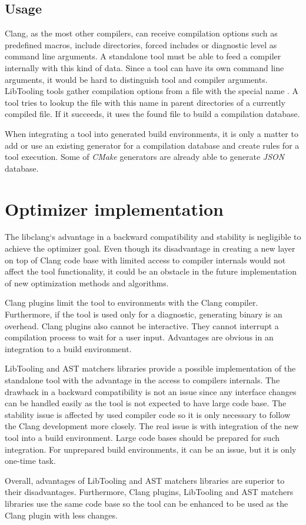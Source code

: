 \subsection{Usage}
Clang, as the most other compilers, can receive compilation options such as predefined macros, include directories, forced includes or diagnostic level as command line arguments. A standalone tool must be able to feed a compiler internally with this kind of data. Since a tool can have its own command line arguments, it would be hard to distinguish tool and compiler arguments. LibTooling tools gather compilation options from a file with the special name . A tool tries to lookup the file with this name in parent directories of a currently compiled file. If it succeeds, it uses the found file to build a compilation database.

When integrating a tool into generated build environments, it is only a matter to add or use an existing generator for a compilation database and create rules for a tool execution. Some of \emph{CMake} \cite{cmake} generators are already able to generate \emph{JSON} database.

\section{Optimizer implementation}
\label{clang-optimizer}
The libclang`s advantage in a backward compatibility and stability is negligible to achieve the optimizer goal. Even though its disadvantage in creating a new layer on top of Clang code base with limited access to compiler internals would not affect the tool functionality, it could be an obstacle in the future implementation of new optimization methods and algorithms.

Clang plugins limit the tool to environments with the Clang compiler. Furthermore, if the tool is used only for a diagnostic, generating binary is an overhead. Clang plugins also cannot be interactive. They cannot interrupt a compilation process to wait for a user input. Advantages are obvious in an integration to a build environment.

LibTooling and AST matchers libraries provide a possible implementation of the standalone tool with the advantage in the access to compilers internals. The drawback in a backward compatibility is not an issue since any interface changes can be handled easily as the tool is not expected to have large code base. The stability issue is affected by used compiler code so it is only necessary to follow the Clang development more closely. The real issue is with integration of the new tool into a build environment. Large code bases should be prepared for such integration. For unprepared build environments, it can be an issue, but it is only one-time task.

Overall, advantages of LibTooling and AST matchers libraries are superior to their disadvantages. Furthermore, Clang plugins, LibTooling and AST matchers libraries use the same code base so the tool can be enhanced to be used as the Clang plugin with less changes.